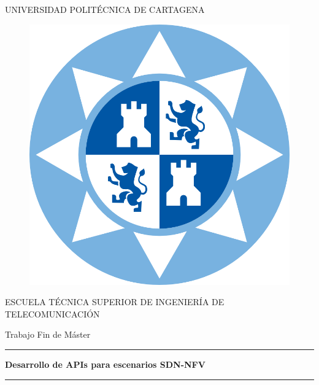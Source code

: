 \documentclass[
11pt, %
spanish, %
singlespacing, %
parskip, %
headsepline, %
]{MastersDoctoralThesis} %
\let\\\space%
\begin{document}
\frontmatter %

\pagestyle{plain} %


\begin{titlepage}
	\begin{center}
		UNIVERSIDAD POLITÉCNICA DE CARTAGENA\\
		\vspace*{0.2in}
		\begin{figure}[ht!]
			\centering
			\includegraphics[width=0.5\linewidth]{imagenes/logoupct.jpg}
		\end{figure}
		ESCUELA TÉCNICA SUPERIOR DE INGENIERÍA DE TELECOMUNICACIÓN\\
		\vspace*{0.35in}
		\begin{large}
			Trabajo Fin de Máster\\
		\end{large}
		\vspace*{0.25in}
		\rule{80mm}{0.1mm}\\
		\vspace*{0.3in}
		\begin{Large}
			\textbf{Desarrollo de APIs para escenarios SDN-NFV} \\
		\end{Large}
		\vspace*{0.35in}
		\rule{80mm}{0.1mm}\\
		\vspace*{0.55in}
	\end{center}
    \vfill
	\begin{flushleft}

\end{flushleft}
\end{titlepage}
\end{document}
